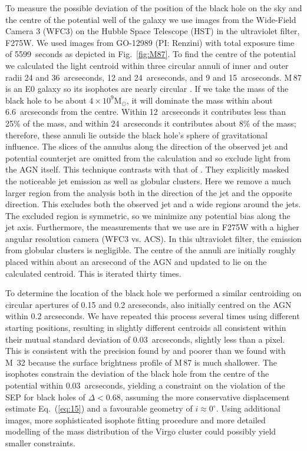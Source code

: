 \documentclass[useAMS,usenatbib]{mn2e}
\newcommand{\msun}{\mathrm{M}_\odot}
\begin{document}
To measure the possible deviation of the position of the black hole on
the sky and the centre of the potential well of the galaxy we use
images from the Wide-Field Camera 3 (WFC3) on the Hubble Space
Telescope (HST) in the ultraviolet filter, F275W.  We used images from
GO-12989 (PI: Renzini) with total exposure time of 5599~seconds as
depicted in Fig.~\ref{fig:M87}.  To find the centre of the potential
we 
calculated 
the light centroid within three circular annuli of inner
and outer radii 24 and 36~arcseconds, 12 and 24~arcseconds, and 9 and
15~arcseconds.  M\,87 is an E0 galaxy so its isophotes are nearly
circular \citep{2006ApJS..164..334F}.  If we take the mass of the
black hole to be about $4\times 10^9\msun$, it will dominate the mass
within about 6.6~arcseconds from the centre.  Within 12~arcseconds it
contributes less than 25\% of the mass, and within 24~arcseconds it
contributes about 8\% of the mass; therefore, these annuli lie outside
the black hole's sphere of gravitational influence.  The slices of the
annulus along the direction of the observed jet and potential
counterjet are omitted from the calculation and so exclude light from
the AGN itself.  This 
technique 
contrasts with that of
\citet{2010ApJ...717L...6B}.  They explicitly masked the noticeable jet
emission as well as globular clusters.  Here we remove a much larger
region from the analysis both in the direction of the jet and the
opposite direction.  This excludes both the observed jet and a wide
regions around the jets.  The excluded region is symmetric, so we
minimize any potential bias along the jet axis.  Furthermore, the
measurements that we use are in F275W with a higher angular resolution
camera (WFC3 vs. ACS).  In this ultraviolet filter, the emission from
globular clusters is negligible.  The centre of the annuli are
initially roughly placed within about an arcsecond of the AGN and
updated to lie on the calculated centroid. This is iterated thirty
times.

To determine the location of the black hole we performed a similar
centroiding on circular
apertures
of 0.15 and 0.2 arcseconds, also initially centred on the AGN within
0.2 arcseconds.  We have repeated this process several times using
different starting positions, resulting in slightly different
centroids all consistent within their mutual standard deviation of
0.03~arcseconds, slightly less than a pixel.  This is consistent with
the precision found by \citet{2013ApJ...770...86W} and poorer than we
found with M~32 because the surface brightness profile of M\,87 is
much shallower.  The isophotes constrain the deviation of the black
hole from the centre of the potential within 0.03~arcseconds, yielding
a constraint on the violation of the SEP for black holes of
$\Delta<0.68$, assuming the more conservative displacement estimate
Eq.~(\ref{eq:15}) and a favourable geometry of $i\approx 0^\circ$.
Using additional images, more sophisticated isophote fitting procedure
and more detailed modelling of the mass distribution of the Virgo
cluster could possibly yield smaller constraints.
\end{document}
